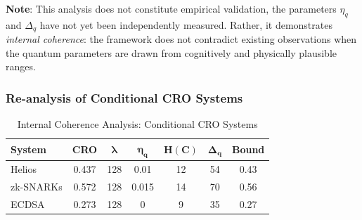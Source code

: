 \documentclass{ieeeaccess}
\begin{document}
\textbf{Note}: This analysis does not constitute empirical validation, the parameters $\eta_q$ and $\Delta_q$ have not yet been independently measured. Rather, it demonstrates \emph{internal coherence}: the framework does not contradict existing observations when the quantum parameters are drawn from cognitively and physically plausible ranges.

\subsubsection{Re-analysis of Conditional CRO Systems}

\begin{table}[h]
\centering
\caption{Internal Coherence Analysis: Conditional CRO Systems}
\label{tab:internal_coherence}
\begin{tabular}{lcccccc}
\toprule
\textbf{System} & \textbf{CRO} & $\boldsymbol{\lambda}$ & $\boldsymbol{\eta_q}$ & $\boldsymbol{H(C)}$ & $\boldsymbol{\Delta_q}$ & \textbf{Bound} \\
\midrule
Helios & 0.437 & 128 & 0.01 & 12 & 54 & 0.43 \\
zk-SNARKs & 0.572 & 128 & 0.015 & 14 & 70 & 0.56 \\
ECDSA & 0.273 & 128 & 0 & 9 & 35 & 0.27 \\
\bottomrule
\end{tabular}
\end{table}
\end{document}
